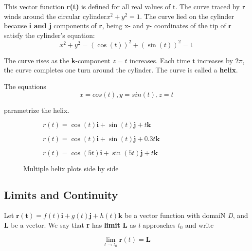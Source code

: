 \documentclass[12pt,a4paper]{article}
\newenvironment{definition}{\begin{definitionbox}}{\end{definitionbox}\vspace{1\baselineskip}}
\begin{document}
\noindent This vector function \textbf{r(\textnormal{t})} is defined for all real values of t. The curve traced by \textbf{r} winds around the circular cylinder\(x^2 + y^2 = 1\). The curve lied on the cylinder because \textbf{i \textnormal{and} j} components of \textbf{r}, being x- and y- coordinates of the tip of \textbf{r} satisfy the cylinder's equation:
\[ x^2 + y^2 = (\cos(t))^2 + (\sin(t))^2 = 1\]

The curve rises as the \textbf{k}-component \(z = t\) increases. Each time t increases by \(2\pi\), the curve completes one turn around the cylinder. The curve is called a \textbf{helix}.

The equations 
\[x = cos(t), y = sin(t), z = t\] 

parametrize the helix. 

\begin{figure}[h]
  \centering
  \begin{subfigure}[b]{0.3\textwidth} %
      \centering
      \resizebox{\linewidth}{!}{} %
      \caption{\(r(t) = \cos(t)\mathbf{i} + \sin(t)\mathbf{j} + t\mathbf{k}\)} %
      \label{fig:plot1}
  \end{subfigure}
  \begin{subfigure}[b]{0.3\textwidth} %
      \centering
      \resizebox{\linewidth}{!}{} %
      \caption{\(r(t) = \cos(t)\mathbf{i} + \sin(t)\mathbf{j} + 0.3t\mathbf{k}\)} %
      \label{fig:plot2}
  \end{subfigure}
  \begin{subfigure}[b]{0.3\textwidth} %
    \centering
    \resizebox{\linewidth}{!}{} %
    \caption{\(r(t) = \cos(5t)\mathbf{i} + \sin(5t)\mathbf{j} + t\mathbf{k}\)}
    \label{fig:plot3} %
  \end{subfigure}
  \caption{Multiple helix plots side by side}
  \label{fig:multiplot}
\end{figure}

\newpage

\subsection{Limits and Continuity}

\begin{definition}
  Let \(\mathbf{r(t)} = f(t)\mathbf{i} + g(t)\mathbf{j} + h(t)\mathbf{k}\) be a vector function with domaiN \textit{D}, and \textbf{L} be a vector. We say that \textbf{r} has \textbf{limit L} as \textit{t} approaches \(t_0\) and write

  \[\lim_{t \to t_0} \mathbf{r}(t) = \mathbf{L}\]

\end{definition}
\end{document}
